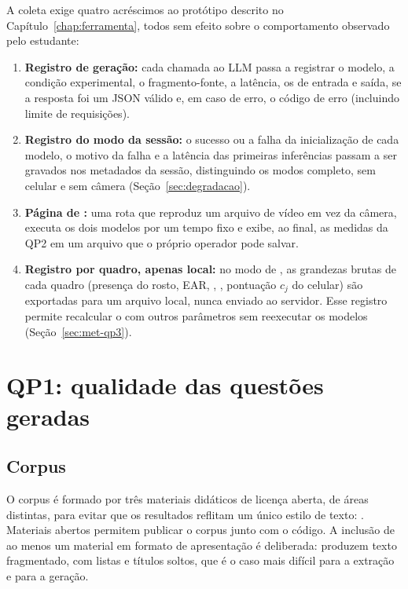 A coleta exige quatro acréscimos ao protótipo descrito no Capítulo~\ref{chap:ferramenta}, todos sem efeito sobre o comportamento observado pelo estudante:

\begin{enumerate}
  \item \textbf{Registro de geração:} cada chamada ao LLM passa a registrar o modelo, a condição experimental, o fragmento-fonte, a latência, os  de entrada e saída, se a resposta foi um JSON válido e, em caso de erro, o código de erro (incluindo limite de requisições).
  \item \textbf{Registro do modo da sessão:} o sucesso ou a falha da inicialização de cada modelo, o motivo da falha e a latência das primeiras inferências passam a ser gravados nos metadados da sessão, distinguindo os modos completo, sem celular e sem câmera (Seção~\ref{sec:degradacao}).
  \item \textbf{Página de :} uma rota que reproduz um arquivo de vídeo em vez da câmera, executa os dois modelos por um tempo fixo e exibe, ao final, as medidas da QP2 em um arquivo que o próprio operador pode salvar.
  \item \textbf{Registro por quadro, apenas local:} no modo de , as grandezas brutas de cada quadro (presença do rosto, EAR, , , pontuação $c_j$ do celular) são exportadas para um arquivo local, nunca enviado ao servidor. Esse registro permite recalcular o \fs com outros parâmetros sem reexecutar os modelos (Seção~\ref{sec:met-qp3}).
\end{enumerate}

\section{\label{sec:met-qp1}QP1: qualidade das questões geradas}

\subsection{Corpus}

O corpus é formado por três materiais didáticos de licença aberta, de áreas distintas, para evitar que os resultados reflitam um único estilo de texto: . Materiais abertos permitem publicar o corpus junto com o código. A inclusão de ao menos um material em formato de apresentação é deliberada:  produzem texto fragmentado, com listas e títulos soltos, que é o caso mais difícil para a extração e para a geração.

